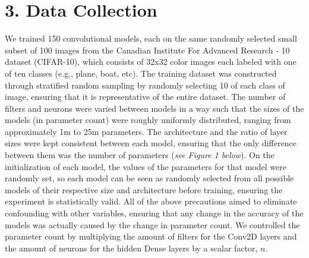 \documentclass[12pt]{article}
\begin{document}
    \section*{3. Data Collection}

    We trained 150 convolutional models, each on the same randomly selected small subset of 100 images
    from the Canadian Institute For Advanced Research - 10 dataset (CIFAR-10), which consists of 32x32 color images each labeled with one of ten classes (e.g., plane, boat, etc).
    The training dataset was constructed through stratified random sampling by randomly selecting 10 of each class of image, ensuring that it is representative of the entire dataset.
    The number of filters and neurons were varied between models in a way such that the sizes of the models (in parameter count) were roughly uniformly distributed, ranging from approximately 1m to 25m parameters.
    The architecture and the ratio of layer sizes were kept consistent between each model, ensuring that the only difference between them was the number of parameters (\textit{see Figure 1 below}).
    On the initialization of each model, the values of the parameters for that model were randomly set, so each model can be seen as randomly
    selected from all possible models of their respective size and architecture before training, ensuring the experiment is statistically valid.
    All of the above precautions aimed to eliminate confounding with other variables, ensuring that any change in the accuracy of the models was actually caused by the change in parameter count.
    We controlled the parameter count by multiplying the amount of filters for the Conv2D layers and the amount of neurons
    for the hidden Dense layers by a scalar factor, $n$.
\end{document}
